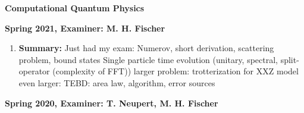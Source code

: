 \documentclass{article}%
\begin{document}
%
\normalsize%
\begin{center}%
\begin{Large}%
\textbf{Computational Quantum Physics}%
\end{Large}%
\linebreak%
\end{center}%
\begin{center}%
\begin{large}%
\textbf{Spring 2021, Examiner: M. H. Fischer}%
\end{large}%
\end{center}%
\begin{enumerate}%
\item%
\begin{mycolorbox}%
\textbf{Summary:}%
\newline%
Just had my exam:\newline%
Numerov, short derivation, scattering problem, bound states\newline%
Single particle time evolution (unitary, spectral, split{-}operator (complexity of FFT))\newline%
larger problem: trotterization for XXZ model\newline%
even larger: TEBD: area law, algorithm, error sources%
\end{mycolorbox}%
\end{enumerate}%
\newpage%
\begin{center}%
\begin{large}%
\textbf{Spring 2020, Examiner: T. Neupert, M. H. Fischer}%
\end{large}%
\end{center}%
\end{document}
